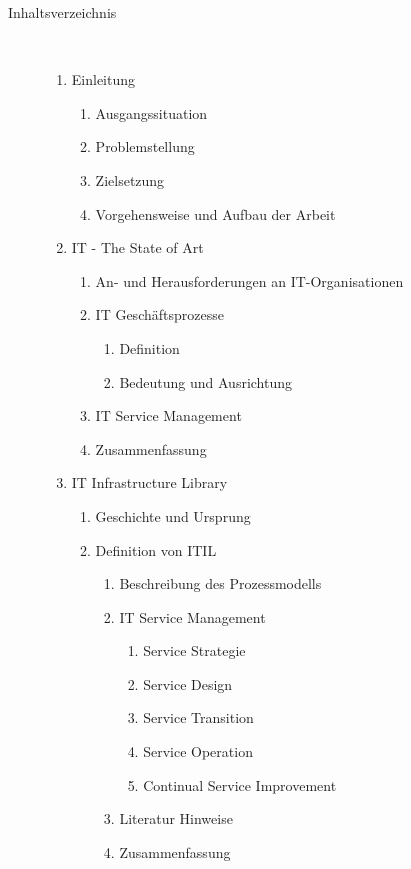 \begin{center}
\begin{description}
\item[Inhaltsverzeichnis]~\par
   \begin{enumerate}
      \item Einleitung
      \begin{enumerate}
         \item Ausgangssituation
         \item Problemstellung
         \item Zielsetzung
         \item Vorgehensweise und Aufbau der Arbeit
      \end{enumerate}
      \item IT - The State of Art
      \begin{enumerate}
      	\item An- und Herausforderungen an IT-Organisationen
	\item IT Geschäftsprozesse
	\begin{enumerate}
		\item Definition
		\item Bedeutung und Ausrichtung
	\end{enumerate}
	\item IT Service Management
	\item Zusammenfassung
      \end{enumerate}
      \item IT Infrastructure Library
      	\begin{enumerate}
      		\item Geschichte und Ursprung
		\item Definition von ITIL
		\begin{enumerate}
			\item Beschreibung des Prozessmodells
			\item IT Service Management
			\begin{enumerate}
      				\item Service Strategie
				\item Service Design
				\item Service Transition
				\item Service Operation
				\item Continual Service Improvement
			\end{enumerate}
			\item Literatur Hinweise
			\item Zusammenfassung

\end{enumerate}
\end{enumerate}
\end{enumerate}
\end{description}
\end{center}
